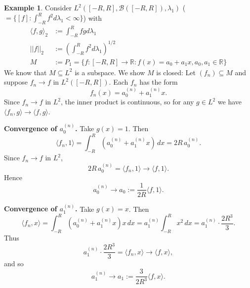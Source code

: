 \documentclass[11pt,a4paper]{article}
\theoremstyle{definition}
\newtheorem{example}{Example}[section]
\begin{document}
\begin{example}
    Consider $L^2([-R, R], \mathcal{B}([-R,R]), \lambda _1) $ ($=\{[f]:\int _{-R}^Rf^2 d\lambda _1 < \infty \}$) with 
    \begin{align*}
        \langle f,g \rangle _2 & := \int _{-R}^R fg d\lambda _1\\
        ||f||_2 & := \left ( \int _{-R}^R f^2 d\lambda _1\right )^{1/2} \\
        M & := P_1 = \{f: [-R,R] \to \mathbb{R}: f(x) = a_0 + a_1x , a_0,a_1 \in \mathbb{R}\}
    \end{align*}
    We know that $M \subseteq L^2$ is a subspace. We show $M$ is closed: Let $(f_n) \subseteq M$ and suppose $f_n \to f$ in $L^2([-R,R])$.
Each $f_n$ has the form
\[
    f_n(x) = a_0^{(n)} + a_1^{(n)} x.
\]
Since $f_n \to f$ in $L^2$, the inner product is continuous, so for any 
$g \in L^2$ we have $\langle f_n, g \rangle \to \langle f, g \rangle$.

\medskip

\noindent\textbf{Convergence of $a_0^{(n)}$.}
Take $g(x) = 1$. Then
\[
    \langle f_n, 1 \rangle
    = \int_{-R}^R (a_0^{(n)} + a_1^{(n)} x)\, dx
    = 2R\, a_0^{(n)}.
\]
Since $f_n \to f$ in $L^2$,
\[
    2R\, a_0^{(n)} = \langle f_n, 1 \rangle 
        \longrightarrow \langle f, 1 \rangle.
\]
Hence
\[
    a_0^{(n)} \longrightarrow 
    a_0 := \frac{1}{2R} \langle f, 1 \rangle.
\]

\medskip

\noindent\textbf{Convergence of $a_1^{(n)}$.}
Take $g(x) = x$. Then
\[
    \langle f_n, x \rangle
    = \int_{-R}^R (a_0^{(n)} + a_1^{(n)} x)x \, dx
    = a_1^{(n)} \int_{-R}^R x^2 \, dx
    = a_1^{(n)} \cdot \frac{2R^3}{3}.
\]
Thus
\[
    a_1^{(n)} \cdot \frac{2R^3}{3}
    = \langle f_n, x \rangle 
        \longrightarrow \langle f, x \rangle,
\]
and so
\[
    a_1^{(n)} \longrightarrow 
    a_1 := \frac{3}{2R^3} \langle f, x \rangle.
\]

\medskip


\end{example}
\end{document}
